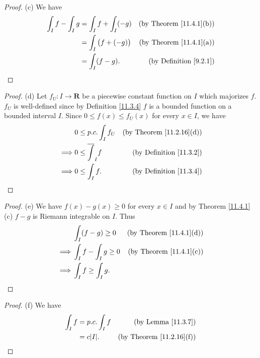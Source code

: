 \begin{proof}{(c)}
    We have
    \begin{align*}
        \int_I f - \int_I g & = \int_I f + \int_I (-g)    & \text{(by Theorem \ref{11.4.1}(b))} \\
                            & = \int_I \big(f + (-g)\big) & \text{(by Theorem \ref{11.4.1}(a))} \\
                            & = \int_I (f - g).           & \text{(by Definition \ref{9.2.1})}
    \end{align*}
\end{proof}

\begin{proof}{(d)}
    Let \(f_U : I \to \mathbf{R}\) be a piecewise constant function on \(I\) which majorizes \(f\).
    \(f_U\) is well-defined since by Definition \ref{11.3.4} \(f\) is a bounded function on a bounded interval \(I\).
    Since \(0 \leq f(x) \leq f_U(x)\) for every \(x \in I\), we have
    \begin{align*}
                 & 0 \leq p.c. \int_I f_U     & \text{(by Theorem \ref{11.2.16}(d))} \\
        \implies & 0 \leq \overline{\int}_I f & \text{(by Definition \ref{11.3.2})}  \\
        \implies & 0 \leq \int_I f.           & \text{(by Definition \ref{11.3.4})}
    \end{align*}
\end{proof}

\begin{proof}{(e)}
    We have \(f(x) - g(x) \geq 0\) for every \(x \in I\) and by Theorem \ref{11.4.1}(c) \(f - g\) is Riemann integrable on \(I\).
    Thus
    \begin{align*}
                 & \int_I (f - g) \geq 0      & \text{(by Theorem \ref{11.4.1}(d))} \\
        \implies & \int_I f - \int_I g \geq 0 & \text{(by Theorem \ref{11.4.1}(c))} \\
        \implies & \int_I f \geq \int_I g.
    \end{align*}
\end{proof}

\begin{proof}{(f)}
    We have
    \begin{align*}
        \int_I f & = p.c. \int_I f & \text{(by Lemma \ref{11.3.7})}       \\
                 & = c \abs*{I}.   & \text{(by Theorem \ref{11.2.16}(f))}
    \end{align*}
\end{proof}

